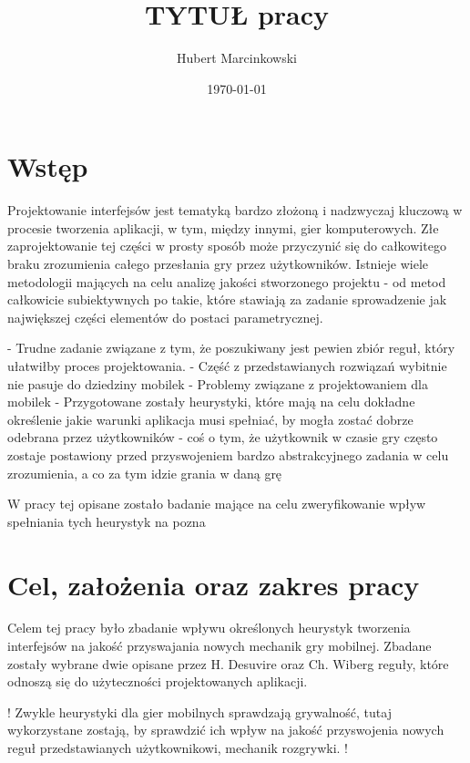 \documentclass[a4paper,12pt,numbers=noenddot]{report}
\title{TYTUŁ pracy}
\date{\today}
\author{Hubert Marcinkowski}
\begin{document}
	\nocite{*}
	

	\newpage
	\tableofcontents
	\newpage
	
\chapter{Wstęp}
Projektowanie interfejsów jest tematyką bardzo złożoną i nadzwyczaj kluczową w procesie tworzenia aplikacji, w tym, między innymi, gier komputerowych. Złe zaprojektowanie tej części w prosty sposób może przyczynić się do całkowitego braku zrozumienia całego przesłania gry przez użytkowników. Istnieje wiele metodologii mających na celu analizę jakości stworzonego projektu - od metod całkowicie subiektywnych po takie, które stawiają za zadanie sprowadzenie jak największej części elementów do postaci parametrycznej. 

- Trudne zadanie związane z tym, że poszukiwany jest pewien zbiór reguł, który ułatwiłby proces projektowania. 
- Część z przedstawianych rozwiązań wybitnie nie pasuje do dziedziny mobilek
- Problemy związane z projektowaniem dla mobilek
- Przygotowane zostały heurystyki, które mają na celu dokładne określenie jakie warunki aplikacja musi spełniać, by mogła zostać dobrze odebrana przez użytkowników
- coś o tym, że użytkownik w czasie gry często zostaje postawiony przed przyswojeniem bardzo abstrakcyjnego zadania w celu zrozumienia, a co za tym idzie grania w daną grę

W pracy tej opisane zostało badanie mające na celu zweryfikowanie wpływ spełniania tych heurystyk na pozna

\chapter{Cel, założenia oraz zakres pracy}
Celem tej pracy było zbadanie wpływu określonych heurystyk tworzenia interfejsów na jakość przyswajania nowych mechanik gry mobilnej. Zbadane zostały wybrane dwie opisane przez H. Desuvire oraz Ch. Wiberg \cite{ArticlePLAY} reguły, które odnoszą się do użyteczności projektowanych aplikacji.

!
Zwykle heurystyki dla gier mobilnych sprawdzają grywalność, tutaj wykorzystane zostają, by sprawdzić ich wpływ na jakość przyswojenia nowych reguł przedstawianych użytkownikowi, mechanik rozgrywki.
!\\
\end{document}
